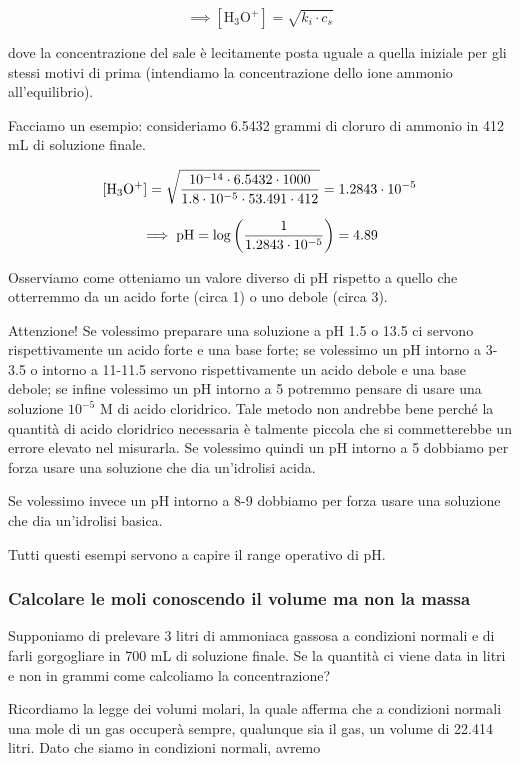$$\implies [\text{H}_3\text{O}^+]=\sqrt{k_i \cdot c_s}$$

dove la concentrazione del sale è lecitamente posta uguale a quella iniziale per gli stessi motivi di prima (intendiamo la concentrazione dello ione ammonio all'equilibrio).

\vspace{0.2cm}Facciamo un esempio: consideriamo 6.5432 grammi di cloruro di ammonio in 412 mL di soluzione finale.

$$\rm [H_3O^+]=\sqrt{\frac{10^{-14} \cdot 6.5432 \cdot 1000}{1.8 \cdot 10^{-5} \cdot 53.491 \cdot 412}}=1.2843 \cdot 10^{-5}$$

$$\implies \rm pH=\log{\left( \frac{1}{1.2843 \cdot 10^{-5}} \right)}=4.89$$

Osserviamo come otteniamo un valore diverso di pH rispetto a quello che otterremmo da un acido forte (circa 1) o uno debole (circa 3).

Attenzione! Se volessimo preparare una soluzione a pH 1.5 o 13.5 ci servono rispettivamente un acido forte e una base forte; se volessimo un pH intorno a 3-3.5 o intorno a 11-11.5 servono rispettivamente un acido debole e una base debole; se infine volessimo un pH intorno a 5 potremmo pensare di usare una soluzione $10^{-5}$ M di acido cloridrico. Tale metodo non andrebbe bene perché la quantità di acido cloridrico necessaria è talmente piccola che si commetterebbe un errore elevato nel misurarla. Se volessimo quindi un pH intorno a 5 dobbiamo per forza usare una soluzione che dia un'idrolisi acida.

Se volessimo invece un pH intorno a 8-9 dobbiamo per forza usare una soluzione che dia un'idrolisi basica.

Tutti questi esempi servono a capire il range operativo di pH.

\subsubsection{Calcolare le moli conoscendo il volume ma non la massa}
Supponiamo di prelevare 3 litri di ammoniaca gassosa a condizioni normali e di farli gorgogliare in 700 mL di soluzione finale. Se la quantità ci viene data in litri e non in grammi come calcoliamo la concentrazione?

Ricordiamo la legge dei volumi molari, la quale afferma che a condizioni normali una mole di un gas occuperà sempre, qualunque sia il gas, un volume di 22.414 litri. Dato che siamo in condizioni normali, avremo

